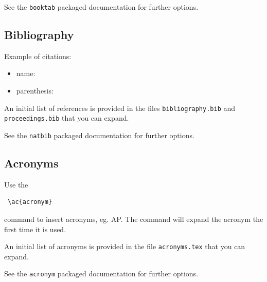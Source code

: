 \documentclass{ceurart}
\begin{document}
See the \texttt{booktab} packaged documentation for further options.

\subsection{Bibliography}

Example of citations:
\begin{itemize}
	\item name: \citet{Salton1968}
	\item parenthesis: \citep{Salton1968}
\end{itemize}

An initial list of references is provided in the files \texttt{bibliography.bib} and \texttt{proceedings.bib} that you can expand.

See the \texttt{natbib} packaged documentation for further options.

\subsection{Acronyms}

Use the 

\begin{verbatim}
 \ac{acronym}
 \end{verbatim}

command to insert acronyms, eg. \ac{AP}. The command will expand the acronym the first time it is used.

An initial list of acronyms is provided in the file \texttt{acronyms.tex} that you can expand.

See the \texttt{acronym} packaged documentation for further options.
\fi




\end{document}
